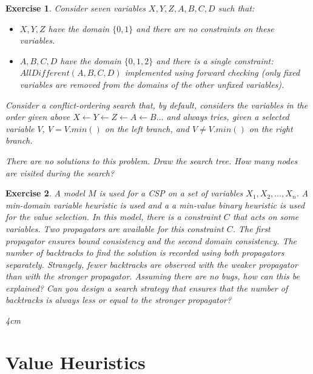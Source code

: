 \documentclass{article}
\newtheorem{exercise}{Exercise}[section]
\begin{document}
    \begin{exercise}
        Consider seven variables $X, Y, Z, A, B, C, D$ such that:

        \begin{itemize}
        \item $X, Y, Z$ have the domain $\{0,1\}$ and there are no constraints on these variables.
        \item $A, B, C, D$ have the domain $\{0,1,2\}$ and there is a single constraint: $AllDifferent(A, B, C, D)$ implemented using forward checking (only fixed variables are removed from the domains of the other unfixed variables).
        \end{itemize}
        Consider a \emph{conflict-ordering search} that, by default,
        considers the variables in the order given above $X \leftarrow  Y \leftarrow  Z \leftarrow  A \leftarrow  B \ldots $ and always tries,
        given a selected variable $V$, $V = V.min()$ on the left branch, and $V \neq V.min()$ on the right branch.

        There are no solutions to this problem.
        Draw the search tree.
        How many nodes are visited during the search?
    \end{exercise}

    \begin{exercise}
        A model $M$ is used for a CSP on a set of variables $X_1, X_2, \ldots, X_n$.
        A min-domain variable heuristic is used and a a min-value binary heuristic is used for the value selection.
        In this model, there is a constraint $C$ that acts on some variables.
        Two propagators are available for this constraint $C$.
        The first propagator ensures bound consistency and the second domain consistency.
        The number of backtracks to find the solution is recorded using both propagators separately.
        Strangely, fewer backtracks are observed with the weaker propagator than with the stronger propagator.
        Assuming there are no bugs, how can this be explained?
        Can you design a search strategy that ensures that the number of backtracks
        is always less or equal to the stronger propagator?
        \begin{answerbox}[title=Answer]{4cm}
        \end{answerbox}
    \end{exercise}

    \section{Value Heuristics}
\end{document}
